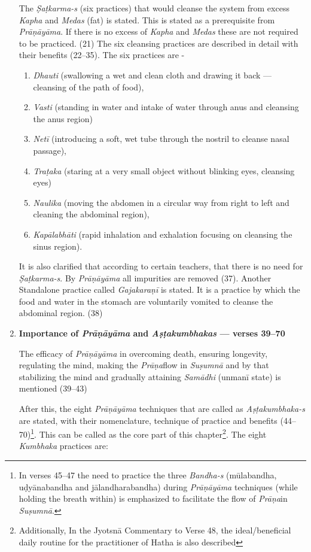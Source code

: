 \begin{enumerate}
The \textit{Ṣaṭkarma-s} (six practices)  that would cleanse the system from excess \textit{Kapha} and \textit{Medas} (fat) is stated. This is stated as a prerequisite from \textit{Prāṇāyāma}. If there is no excess of \textit{Kapha} and \textit{Medas} these are not required to be practiced.  (21) The six cleansing practices are described in detail with their benefits (22--35). The six practices are  -
\begin{enumerate}
\item \textit{Dhauti} (swallowing a wet and clean cloth and drawing it back --- cleansing of the path of food), 
\item \textit{Vasti} (standing in water and intake of water through anus and cleansing the anus region)          
\item \textit{Netī} (introducing a soft, wet tube through the nostril to cleanse nasal passage),                                  
\item \textit{Traṭaka} (staring at a very small object without blinking eyes, cleansing eyes)                            
\item \textit{Naulika} (moving the abdomen in a circular way from right to left and cleaning the abdominal region), 
\item \textit{Kapālabhāti} (rapid inhalation and exhalation focusing on cleansing the sinus region).
\end{enumerate}

It is also clarified that according to certain teachers, that there is no need for \textit{Ṣaṭkarma-s}. By \textit{Prāṇāyāma} all impurities are removed (37). Another Standalone practice called \textit{Gajakaraṇī} is stated. It is a practice by which the food and water in the stomach are voluntarily vomited to cleanse the abdominal region. (38) 

\item \textbf{Importance of \textit{Prāṇāyāma} and \textit{Aṣṭakumbhakas} --- verses 39--70}

The efficacy of \textit{Prāṇāyāma} in overcoming death, ensuring longevity, regulating the mind, making the \textit{Prāṇa}flow in \textit{Suṣumnā} and by that stabilizing the mind and gradually attaining \textit{Samādhi} (unmanī state) is mentioned (39--43)

After this, the eight \textit{Prāṇāyāma} techniques that are called as \textit{Aṣṭakumbhaka-s} are stated, with their nomenclature, technique of practice and benefits (44--70)\footnote{In verses 45--47 the need to practice the three \textit{Bandha-s} (mūlabandha, uḍyānabandha and jālandharabandha) during \textit{Prāṇāyāma} techniques  (while holding the breath within) is emphasized to facilitate the flow of \textit{Prāṇa}in \textit{Suṣumnā}.}. This can be called as the core part of this chapter\footnote{Additionally, In the Jyotsnā Commentary to Verse 48, the ideal/beneficial daily routine for the practitioner of Hatha is also described}. The eight \textit{Kumbhaka} practices are:


\end{enumerate}
